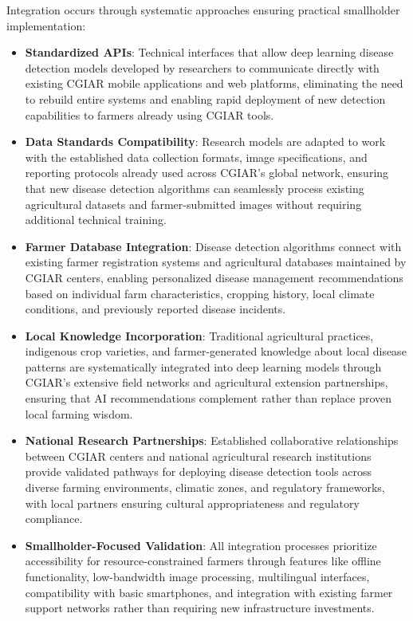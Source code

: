 \documentclass[sn-mathphys]{sn-jnl}
\theoremstyle{thmstyleone}%
\theoremstyle{thmstyletwo}%
\theoremstyle{thmstylethree}%
\begin{document}
Integration occurs through systematic approaches ensuring practical smallholder implementation:
\begin{itemize}
    \item [--] \textbf{Standardized APIs}: Technical interfaces that allow deep learning disease detection models developed by researchers to communicate directly with existing CGIAR mobile applications and web platforms, eliminating the need to rebuild entire systems and enabling rapid deployment of new detection capabilities to farmers already using CGIAR tools.
    
    \item [--] \textbf{Data Standards Compatibility}: Research models are adapted to work with the established data collection formats, image specifications, and reporting protocols already used across CGIAR's global network, ensuring that new disease detection algorithms can seamlessly process existing agricultural datasets and farmer-submitted images without requiring additional technical training.
    
    \item [--] \textbf{Farmer Database Integration}: Disease detection algorithms connect with existing farmer registration systems and agricultural databases maintained by CGIAR centers, enabling personalized disease management recommendations based on individual farm characteristics, cropping history, local climate conditions, and previously reported disease incidents.
    
    \item [--] \textbf{Local Knowledge Incorporation}: Traditional agricultural practices, indigenous crop varieties, and farmer-generated knowledge about local disease patterns are systematically integrated into deep learning models through CGIAR's extensive field networks and agricultural extension partnerships, ensuring that AI recommendations complement rather than replace proven local farming wisdom.
    
    \item [--] \textbf{National Research Partnerships}: Established collaborative relationships between CGIAR centers and national agricultural research institutions provide validated pathways for deploying disease detection tools across diverse farming environments, climatic zones, and regulatory frameworks, with local partners ensuring cultural appropriateness and regulatory compliance.
    
    \item [--] \textbf{Smallholder-Focused Validation}: All integration processes prioritize accessibility for resource-constrained farmers through features like offline functionality, low-bandwidth image processing, multilingual interfaces, compatibility with basic smartphones, and integration with existing farmer support networks rather than requiring new infrastructure investments.
\end{itemize}
\end{document}
